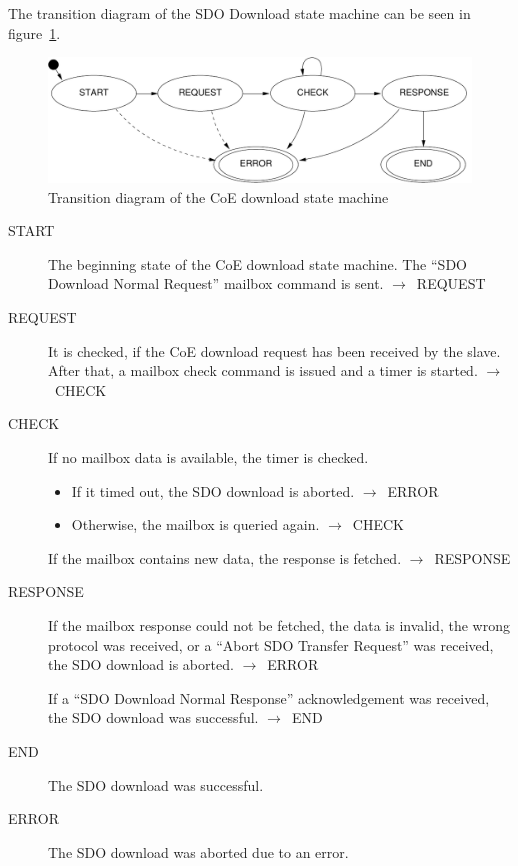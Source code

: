 \documentclass[a4paper,12pt,BCOR6mm,bibtotoc,idxtotoc]{scrbook}
\begin{document}
The transition diagram of the SDO Download state machine can be seen
in figure~\ref{fig:fsm-coedown}.

\begin{figure}[htbp]
  \centering
  \includegraphics[width=.9\textwidth]{images/fsm-coedown} %
  \caption{Transition diagram of the CoE download state machine}
  \label{fig:fsm-coedown}
\end{figure}


\begin{description}
\item[START] The beginning state of the CoE download state
  machine. The ``SDO Download Normal Request'' mailbox command is
  sent. $\rightarrow$~REQUEST

\item[REQUEST] It is checked, if the CoE download request has been
  received by the slave. After that, a mailbox check command is issued
  and a timer is started. $\rightarrow$~CHECK

\item[CHECK] If no mailbox data is available, the timer is checked.
  \begin{itemize}
  \item If it timed out, the SDO download is aborted.
    $\rightarrow$~ERROR
  \item Otherwise, the mailbox is queried again.
    $\rightarrow$~CHECK
  \end{itemize}

  If the mailbox contains new data, the response is fetched.
  $\rightarrow$~RESPONSE

\item[RESPONSE] If the mailbox response could not be fetched, the data
  is invalid, the wrong protocol was received, or a ``Abort SDO
  Transfer Request'' was received, the SDO download is aborted.
  $\rightarrow$~ERROR

  If a ``SDO Download Normal Response'' acknowledgement was received,
  the SDO download was successful. $\rightarrow$~END

\item[END] The SDO download was successful.

\item[ERROR] The SDO download was aborted due to an error.

\end{description}
\end{document}
